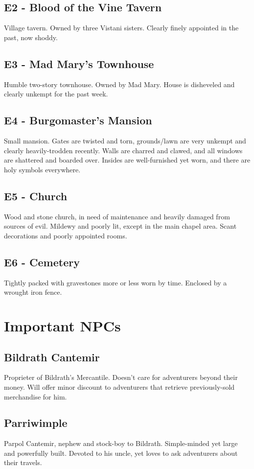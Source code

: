 \documentclass[a4paper,11pt]{article}
\begin{document}
\subsection{E2 - Blood of the Vine Tavern}
  Village tavern. Owned by three Vistani sisters. Clearly finely appointed in the past, now shoddy.
\subsection{E3 - Mad Mary's Townhouse}
  Humble two-story townhouse. Owned by Mad Mary. House is disheveled and clearly unkempt for the past week.
\subsection{E4 - Burgomaster's Mansion}
  Small mansion. Gates are twisted and torn, grounds/lawn are very unkempt and clearly heavily-trodden recently.
  Walls are charred and clawed, and all windows are shattered and boarded over. Insides are well-furnished yet
  worn, and there are holy symbols everywhere.
\subsection{E5 - Church}
  Wood and stone church, in need of maintenance and heavily damaged from sources of evil. Mildewy and poorly 
  lit, except in the main chapel area. Scant decorations and poorly appointed rooms.
\subsection{E6 - Cemetery}
  Tightly packed with gravestones more or less worn by time. Enclosed by a wrought iron fence.


\section{Important NPCs}
\label{sec:ImportantNPCs}
\subsection{Bildrath Cantemir}
  Proprieter of Bildrath's Mercantile. Doesn't care for adventurers beyond their money. Will offer minor discount
  to adventurers that retrieve previously-sold merchandise for him.
\subsection{Parriwimple}
  Parpol Cantemir, nephew and stock-boy to Bildrath. Simple-minded yet large and powerfully built. Devoted to 
  his uncle, yet loves to ask adventurers about their travels.
\end{document}
